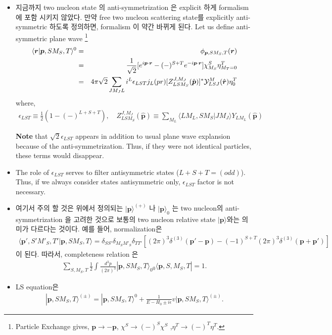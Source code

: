 \documentclass[10pt]{book}
\def\bm{\boldsymbol}
\newcommand{\bea}{\begin{eqnarray}}
\newcommand{\eea}{\end{eqnarray}}
\newcommand{\no}{\nonumber \\}
\def\vp{{\bm p}}
\def\vr{{\bm r}}
\def\la{\langle}
\def\ra{\rangle}
\begin{document}
\begin{itemize}
\item 지금까지 two nucleon state 의 anti-symmetrization 은 
explicit 하게 formalism 에 포함 시키지 않았다.
만약 free two nucleon scattering state를 
explicitly anti-symmetric 하도록 정의하면,
formalism 이 약간 바뀌게 된다.
Let us define anti-symmetric plane wave
\footnote{Particle Exchange gives, $\vp\to -\vp$, $\chi^S\to (-)^S\chi^S$
,$\eta^T\to (-)^T\eta^T$. } 
\bea
\la \vr|\vp,S M_S,T\ra^{0}&=&\phi_{\vp,S M_S,T}(\vr)\no
 &=&\frac{1}{\sqrt{2}}[e^{i\vp\cdot\vr}-(-)^{S+T} e^{-i\vp\cdot\vr}]
    \chi^{S}_{M_S}\eta^{T}_{M_T=0} \no
 &=&4\pi\sqrt{2}\sum_{J M_J L} i^L \epsilon_{LST}
     j_L(pr)[Z^{J,M_J}_{LS M_S}(\hat{\vp})]^*
     {\cal Y}^{M}_{LSJ}(\hat{\vr})\eta^T_0   
\eea
where,
\bea
\epsilon_{LST}\equiv\frac{1}{2}(1-(-)^{L+S+T}),\quad
Z^{J,M_J}_{LS M_S}(\hat{\vp})
\equiv \sum_{M_L}\la L M_L,S M_S|J M_J\ra Y_{L M_L}(\hat{\vp})
\eea

{\bf Note} that $\sqrt{2}\epsilon_{LST}$ appears in addition to usual
plane wave explansion because of the anti-symmetrization. Thus,
if they were not identical particles, these terms would disappear.

\item The role of $\epsilon_{LST}$ serves to filter  
      antisymmetric states ($L+S+T=(odd)$). Thus, if we always
      consider states antisymmetric only, $\epsilon_{LST}$
      factor is not necessary.

\item 여기서 주의 할 것은 위에서 정의되는 
$|\vp\ra^{(+)}$ 나 $|\vp\ra_0$ 는 
two nucleon의 anti-symmetrization 을 고려한 것으로 보통의 two nucleon
relative state $|\vp\ra$와는 의미가 다르다는 것이다.
예를 들어, normalization은 
\bea
\la \vp',S' M'_S,T'|\vp,S M_S,T\ra
=\delta_{SS'}\delta_{M_S M'_S}\delta_{TT'}
 [(2\pi)^3 \delta^{(3)}(\vp'-\vp)-
 (-1)^{S+T}
 (2\pi)^3\delta^{(3)}(\vp+\vp')]
\eea
이 된다. 따라서, completeness relation 은
\bea
\sum_{S,M_S,T}\frac{1}{2}\int \frac{d^3 p}{(2\pi)^3}
|\vp,S M_S,T\ra_0 {}_0\la \vp,S,M_S,T|=1.
\eea

\item LS equation은 
\bea
|\vp,S M_S,T\ra^{(\pm)}=|\vp,S M_S,T\ra^{0}
+\frac{1}{E-H_0\pm i\epsilon} v|\vp,S M_S,T\ra^{(\pm)}.
\eea


\end{itemize}
\end{document}
